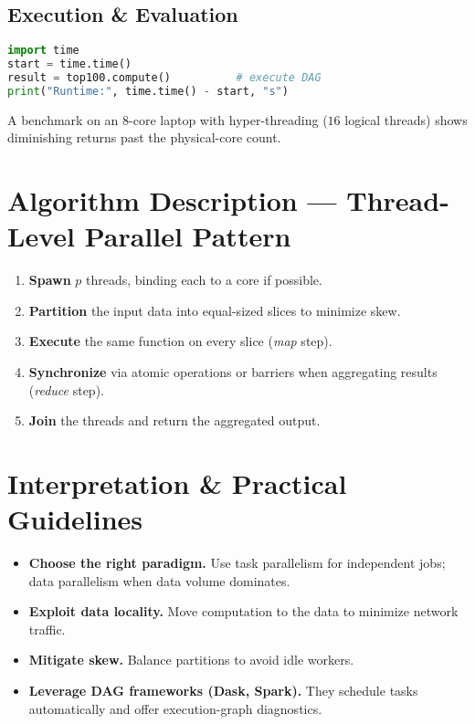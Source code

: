 \documentclass[11pt]{article}
\begin{document}
\subsection{Execution \& Evaluation}
\begin{lstlisting}[language=Python,caption={Materialize and time execution.}]
import time
start = time.time()
result = top100.compute()          # execute DAG
print("Runtime:", time.time() - start, "s")
\end{lstlisting}

A benchmark on an 8-core laptop with hyper-threading ($16$ logical threads) shows diminishing returns past the physical-core count.

\section{Algorithm Description — Thread-Level Parallel Pattern}

\begin{enumerate}[itemsep=0pt]
  \item \textbf{Spawn} $p$ threads, binding each to a core if possible.
  \item \textbf{Partition} the input data into equal-sized slices to minimize skew.
  \item \textbf{Execute} the same function on every slice (\emph{map} step).
  \item \textbf{Synchronize} via atomic operations or barriers when aggregating results (\emph{reduce} step).
  \item \textbf{Join} the threads and return the aggregated output.
\end{enumerate}

\section{Interpretation \& Practical Guidelines}

\begin{itemize}[itemsep=0pt]
  \item \textbf{Choose the right paradigm.} Use task parallelism for independent jobs; data parallelism when data volume dominates.
  \item \textbf{Exploit data locality.} Move computation to the data to minimize network traffic.
  \item \textbf{Mitigate skew.} Balance partitions to avoid idle workers.
  \item \textbf{Leverage DAG frameworks (Dask, Spark).} They schedule tasks automatically and offer execution-graph diagnostics.
\end{itemize}
\end{document}
